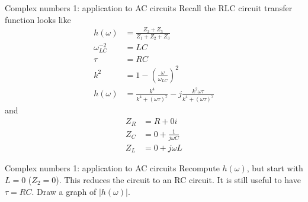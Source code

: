 \documentclass{beamer}
\begin{document}
\begin{frame}{Complex numbers 1: application to AC circuits}
\small
Recall the RLC circuit transfer function looks like
\begin{align}
h(\omega) &= \frac{Z_2 + Z_3}{Z_1+Z_2+Z_3} \\
\omega_{LC}^{-2} &= LC \\
\tau &= RC \\
k^2 &= 1-\left(\frac{\omega}{\omega_{LC}}\right)^2 \\
h(\omega) &= \frac{k^4}{k^4+(\omega\tau)^2}-j \frac{k^2\omega\tau}{k^4+(\omega\tau)^2}
\end{align}
and
\begin{align}
Z_R &= R + 0i \\
Z_C &= 0 + \frac{1}{j\omega C} \\
Z_L &= 0 + j \omega L
\end{align}
\end{frame}

\begin{frame}{Complex numbers 1: application to AC circuits}
Recompute $h(\omega)$, but start with $L = 0$ ($Z_2 = 0$).  This reduces the circuit to an RC circuit.  It is still useful to have $\tau = RC$.  Draw a graph of $|h(\omega)|$.
\end{frame}
\end{document}
